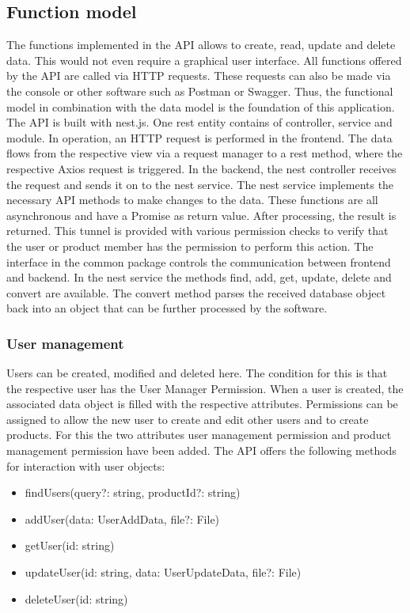     \subsection*{Function model} 
    The functions implemented in the API allows to create, read, update and delete data. This would not even require a graphical user interface. All functions offered by the API are called via HTTP requests. These requests can also be made via the console or other software such as Postman or Swagger. Thus, the functional model in combination with the data model is the foundation of this application. The API is built with nest.js. One rest entity contains of controller, service and module. In operation, an HTTP request is performed in the frontend. The data flows from the respective view via a request manager to a rest method, where the respective Axios request is triggered. In the backend, the nest controller receives the request and sends it on to the nest service. The nest service implements the necessary API methods to make changes to the data. These functions are all asynchronous and have a Promise as return value. After processing, the result is returned. This tunnel is provided with various permission checks to verify that the user or product member has the permission to perform this action. The interface in the common package controls the communication between frontend and backend. In the nest service the methods find, add, get, update, delete and convert are available. The convert method parses the received database object back into an object that can be further processed by the software.

    \subsubsection*{User management}
    Users can be created, modified and deleted here. The condition for this is that the respective user has the User Manager Permission. When a user is created, the associated data object is filled with the respective attributes. Permissions can be assigned to allow the new user to create and edit other users and to create products. For this the two attributes user management permission and product management permission have been added. The API offers the following methods for interaction with user objects:
    
    \begin{itemize}
        \item findUsers(query?: string, productId?: string) 
        \item addUser(data: UserAddData, file?: File)
        \item getUser(id: string)
        \item updateUser(id: string, data: UserUpdateData, file?: File)
        \item deleteUser(id: string)
    \end{itemize}


